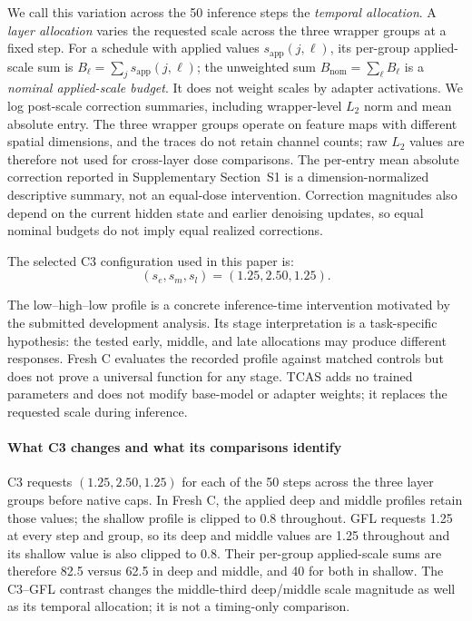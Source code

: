 \documentclass[times,twocolumn,final]{elsarticle}
\begin{document}
We call this variation across the 50 inference steps the \emph{temporal allocation}. A \emph{layer allocation} varies the requested scale across the three wrapper groups at a fixed step. For a schedule with applied values $s_{\mathrm{app}}(j,\ell)$, its per-group applied-scale sum is $B_\ell=\sum_j s_{\mathrm{app}}(j,\ell)$; the unweighted sum $B_{\mathrm{nom}}=\sum_\ell B_\ell$ is a \emph{nominal applied-scale budget}. It does not weight scales by adapter activations. We log post-scale correction summaries, including wrapper-level $L_2$ norm and mean absolute entry. The three wrapper groups operate on feature maps with different spatial dimensions, and the traces do not retain channel counts; raw $L_2$ values are therefore not used for cross-layer dose comparisons. The per-entry mean absolute correction reported in Supplementary Section~S1 is a dimension-normalized descriptive summary, not an equal-dose intervention. Correction magnitudes also depend on the current hidden state and earlier denoising updates, so equal nominal budgets do not imply equal realized corrections.

The selected C3 configuration used in this paper is:
\begin{equation}
(s_e, s_m, s_l) = (1.25, 2.50, 1.25).
\end{equation}

The low--high--low profile is a concrete inference-time intervention motivated by the submitted development analysis. Its stage interpretation is a task-specific hypothesis: the tested early, middle, and late allocations may produce different responses. Fresh C evaluates the recorded profile against matched controls but does not prove a universal function for any stage. TCAS adds no trained parameters and does not modify base-model or adapter weights; it replaces the requested scale during inference.

\paragraph{What C3 changes and what its comparisons identify}
C3 requests $(1.25,2.50,1.25)$ for each of the 50 steps across the three layer groups before native caps. In Fresh C, the applied deep and middle profiles retain those values; the shallow profile is clipped to 0.8 throughout. GFL requests 1.25 at every step and group, so its deep and middle values are 1.25 throughout and its shallow value is also clipped to 0.8. Their per-group applied-scale sums are therefore 82.5 versus 62.5 in deep and middle, and 40 for both in shallow. The C3--GFL contrast changes the middle-third deep/middle scale magnitude as well as its temporal allocation; it is not a timing-only comparison.
\end{document}
